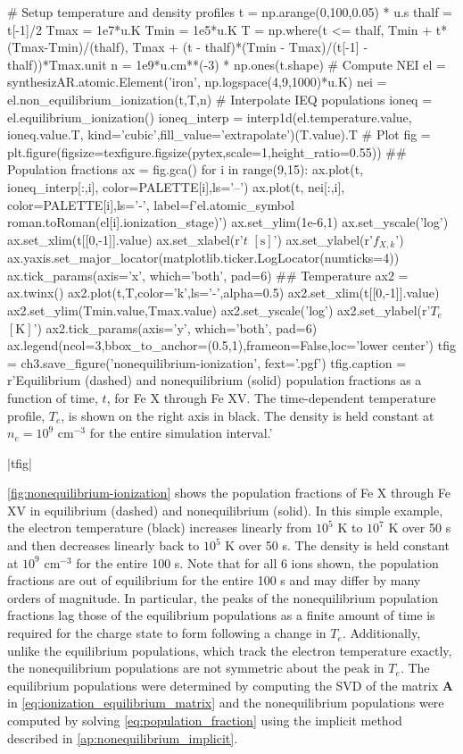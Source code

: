 \begin{pycode}[chapter3]
# Setup temperature and density profiles
t = np.arange(0,100,0.05) * u.s
thalf = t[-1]/2
Tmax = 1e7*u.K
Tmin = 1e5*u.K
T = np.where(t <= thalf, Tmin + t*(Tmax-Tmin)/(thalf),
             Tmax + (t - thalf)*(Tmin - Tmax)/(t[-1] - thalf))*Tmax.unit
n = 1e9*u.cm**(-3) * np.ones(t.shape)
# Compute NEI
el = synthesizAR.atomic.Element('iron', np.logspace(4,9,1000)*u.K)
nei = el.non_equilibrium_ionization(t,T,n)
# Interpolate IEQ populations
ioneq = el.equilibrium_ionization()
ioneq_interp = interp1d(el.temperature.value, ioneq.value.T, 
                        kind='cubic',fill_value='extrapolate')(T.value).T
# Plot
fig = plt.figure(figsize=texfigure.figsize(pytex,scale=1,height_ratio=0.55))
## Population fractions
ax = fig.gca()
for i in range(9,15):
    ax.plot(t, ioneq_interp[:,i], color=PALETTE[i],ls='--')
    ax.plot(t, nei[:,i], color=PALETTE[i],ls='-',
            label=f'{el.atomic_symbol} {roman.toRoman(el[i].ionization_stage)}')
ax.set_ylim(1e-6,1)
ax.set_yscale('log')
ax.set_xlim(t[[0,-1]].value)
ax.set_xlabel(r'$t$ $[\si{\second}]$')
ax.set_ylabel(r'$f_{X,k}$')
ax.yaxis.set_major_locator(matplotlib.ticker.LogLocator(numticks=4))
ax.tick_params(axis='x', which='both', pad=6)
## Temperature
ax2 = ax.twinx()
ax2.plot(t,T,color='k',ls='-',alpha=0.5)
ax2.set_xlim(t[[0,-1]].value)
ax2.set_ylim(Tmin.value,Tmax.value)
ax2.set_yscale('log')
ax2.set_ylabel(r'$T_e$ $[\si{\kelvin}]$')
ax2.tick_params(axis='y', which='both', pad=6)
ax.legend(ncol=3,bbox_to_anchor=(0.5,1),frameon=False,loc='lower center')
tfig = ch3.save_figure('nonequilibrium-ionization', fext='.pgf')
tfig.caption = r'Equilibrium (dashed) and nonequilibrium (solid) population fractions as a function of time, $t$, for Fe X through Fe XV. The time-dependent temperature profile, $T_e$, is shown on the right axis in black. The density is held constant at $n_e=10^9$ $\si{\cm}^{-3}$ for the entire simulation interval.'
\end{pycode}
\py[chapter3]|tfig|

\autoref{fig:nonequilibrium-ionization} shows the population fractions of Fe X through Fe XV in equilibrium (dashed) and nonequilibrium (solid). In this simple example, the electron temperature (black) increases linearly from $10^5$ K to $10^7$ K over 50 s and then decreases linearly back to $10^5$ K over 50 s. The density is held constant at $10^9$ cm$^{-3}$ for the entire 100 s. Note that for all 6 ions shown, the population fractions are out of equilibrium for the entire 100 s and may differ by many orders of magnitude. In particular, the peaks of the nonequilibrium population fractions lag those of the equilibrium populations as a finite amount of time is required for the charge state to form following a change in $T_e$. Additionally, unlike the equilibrium populations, which track the electron temperature exactly, the nonequilibrium populations are not symmetric about the peak in $T_e$. The equilibrium populations were determined by computing the SVD of the matrix $\mathbf{A}$ in \autoref{eq:ionization_equilibrium_matrix} and the nonequilibrium populations were computed by solving \autoref{eq:population_fraction} using the implicit method described in \autoref{ap:nonequilibrium_implicit}.

